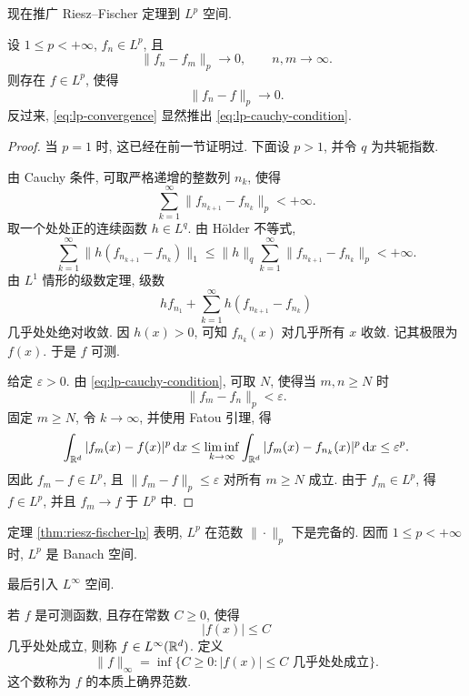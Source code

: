 现在推广 Riesz--Fischer 定理到 \(L^p\) 空间.

\begin{thm}
	\label{thm:riesz-fischer-lp}
	设 \(1\leq p<+\infty\), \(f_n\in L^p\), 且
	\begin{equation}
		\|f_n-f_m\|_p\to0,
		\qquad n,m\to\infty.
		\label{eq:lp-cauchy-condition}
	\end{equation}
	则存在 \(f\in L^p\), 使得
	\begin{equation}
		\|f_n-f\|_p\to0.
		\label{eq:lp-convergence}
	\end{equation}
	反过来, \eqref{eq:lp-convergence} 显然推出 \eqref{eq:lp-cauchy-condition}.
\end{thm}

\begin{proof}
	当 \(p=1\) 时, 这已经在前一节证明过. 下面设 \(p>1\), 并令 \(q\) 为共轭指数.
	
	由 Cauchy 条件, 可取严格递增的整数列 \(n_k\), 使得
	\[
	\sum_{k=1}^{\infty}\|f_{n_{k+1}}-f_{n_k}\|_p<+\infty.
	\]
	取一个处处正的连续函数 \(h\in L^q\). 由 H\"older 不等式,
	\[
	\sum_{k=1}^{\infty}
	\|h(f_{n_{k+1}}-f_{n_k})\|_1
	\leq
	\|h\|_q
	\sum_{k=1}^{\infty}\|f_{n_{k+1}}-f_{n_k}\|_p
	<+\infty.
	\]
	由 \(L^1\) 情形的级数定理, 级数
	\[
	h f_{n_1}
	+
	\sum_{k=1}^{\infty}h(f_{n_{k+1}}-f_{n_k})
	\]
	几乎处处绝对收敛. 因 \(h(x)>0\), 可知 \(f_{n_k}(x)\) 对几乎所有 \(x\) 收敛. 记其极限为 \(f(x)\). 于是 \(f\) 可测.
	
	给定 \(\varepsilon>0\). 由 \eqref{eq:lp-cauchy-condition}, 可取 \(N\), 使得当 \(m,n\geq N\) 时
	\[
	\|f_m-f_n\|_p<\varepsilon.
	\]
	固定 \(m\geq N\), 令 \(k\to\infty\), 并使用 Fatou 引理, 得
	\[
	\int_{\mathbb{R}^d}|f_m(x)-f(x)|^p\,\dd x
	\leq
	\liminf_{k\to\infty}
	\int_{\mathbb{R}^d}|f_m(x)-f_{n_k}(x)|^p\,\dd x
	\leq
	\varepsilon^p.
	\]
	因此 \(f_m-f\in L^p\), 且 \(\|f_m-f\|_p\leq\varepsilon\) 对所有 \(m\geq N\) 成立. 由于 \(f_m\in L^p\), 得 \(f\in L^p\), 并且 \(f_m\to f\) 于 \(L^p\) 中.
\end{proof}

\begin{rem}
	定理 \ref{thm:riesz-fischer-lp} 表明, \(L^p\) 在范数 \(\|\cdot\|_p\) 下是完备的. 因而 \(1\leq p<+\infty\) 时, \(L^p\) 是 Banach 空间.
\end{rem}

最后引入 \(L^\infty\) 空间.

\begin{defn}[\(L^\infty\) 空间]
	\label{def:l-infinity}
	若 \(f\) 是可测函数, 且存在常数 \(C\geq0\), 使得
	\[
	|f(x)|\leq C
	\]
	几乎处处成立, 则称 \(f\in L^\infty(\mathbb{R}^d)\). 定义
	\[
	\|f\|_\infty
	=
	\inf\{C\geq0: |f(x)|\leq C\text{ 几乎处处成立}\}.
	\]
	这个数称为 \(f\) 的本质上确界范数.
\end{defn}

